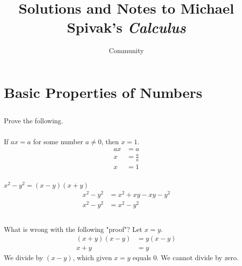 \documentclass[12pt]{article}
\begin{document}
\title{Solutions and Notes to Michael Spivak's \emph{Calculus}}
\author{Community}
\date{}
\maketitle
\cleardoublepage

\section{Basic Properties of Numbers}
\subsection{}
Prove the following.
\subsubsection{}
If $ax=a$ for some number $ a\neq 0$, then $x=1$.
\begin{equation*}
\begin{split}
ax&=a\\ 
x&=\frac{a}{a}\\
x&=1
\end{split}
\end{equation*}
\subsubsection{}
$x^2-y^2=(x-y)(x+y)$
\begin{equation*}
\begin{split}
x^2 - y^2 &= x^2 + xy - xy - y^2\\ 
x^2 - y^2 &= x^2 - y^2
\end{split}
\end{equation*}

\subsection{}
What is wrong with the following "proof"? Let $x=y$.
\begin{equation*}
\begin{split}
(x+y)(x-y) &= y(x-y)\\ 
x + y &= y
\end{split}
\end{equation*}
We divide by $(x-y)$, which given $x=y$ equals $0$. We cannot divide by zero.
\end{document}
